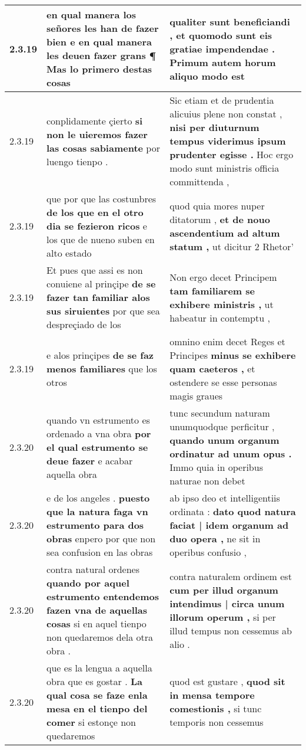 \begin{tabular}{|p{1cm}|p{6.5cm}|p{6.5cm}|}
2.3.19 & en qual manera los señores les han de fazer bien \textbf{ e en qual manera les deuen fazer grans ¶ } Mas lo primero destas cosas & qualiter sunt beneficiandi , \textbf{ et quomodo sunt eis gratiae impendendae . } Primum autem horum aliquo modo est \\\hline
2.3.19 & conplidamente çierto \textbf{ si non le uieremos fazer las cosas sabiamente } por luengo tienpo . & Sic etiam et de prudentia alicuius plene non constat , \textbf{ nisi per diuturnum tempus viderimus ipsum prudenter egisse . } Hoc ergo modo sunt ministris officia committenda , \\\hline
2.3.19 & que por que las costunbres \textbf{ de los que en el otro dia se fezieron ricos } e los que de nueno suben en alto estado & quod quia mores nuper ditatorum , \textbf{ et de nouo ascendentium ad altum statum , } ut dicitur 2 Rhetor’ \\\hline
2.3.19 & Et pues que assi es non conuiene al prinçipe \textbf{ de se fazer tan familiar alos sus siruientes } por que sea despreçiado de los & Non ergo decet Principem \textbf{ tam familiarem se exhibere ministris , } ut habeatur in contemptu , \\\hline
2.3.19 & e alos prinçipes \textbf{ de se faz menos familiares } que los otros & omnino enim decet Reges et Principes \textbf{ minus se exhibere quam caeteros , } et ostendere se esse personas magis graues \\\hline
2.3.20 & quando vn estrumento es ordenado a vna obra \textbf{ por el qual estrumento se deue fazer } e acabar aquella obra & tunc secundum naturam unumquodque perficitur , \textbf{ quando unum organum ordinatur ad unum opus . } Immo quia in operibus naturae non debet \\\hline
2.3.20 & e de los angeles . \textbf{ puesto que la natura faga vn estrumento para dos obras } enpero por que non sea confusion en las obras & ab ipso deo et intelligentiis ordinata : \textbf{ dato quod natura faciat | idem organum ad duo opera , } ne sit in operibus confusio , \\\hline
2.3.20 & contra natural ordenes \textbf{ quando por aquel estrumento entendemos fazen vna de aquellas cosas } si en aquel tienpo non quedaremos dela otra obra . & contra naturalem ordinem est \textbf{ cum per illud organum intendimus | circa unum illorum operum , } si per illud tempus non cessemus ab alio . \\\hline
2.3.20 & que es la lengua a aquella obra que es gostar . \textbf{ La qual cosa se faze enla mesa en el tienpo del comer } si estonçe non quedaremos & quod est gustare , \textbf{ quod sit in mensa tempore comestionis , } si tunc temporis non cessemus \\\hline

\end{tabular}

